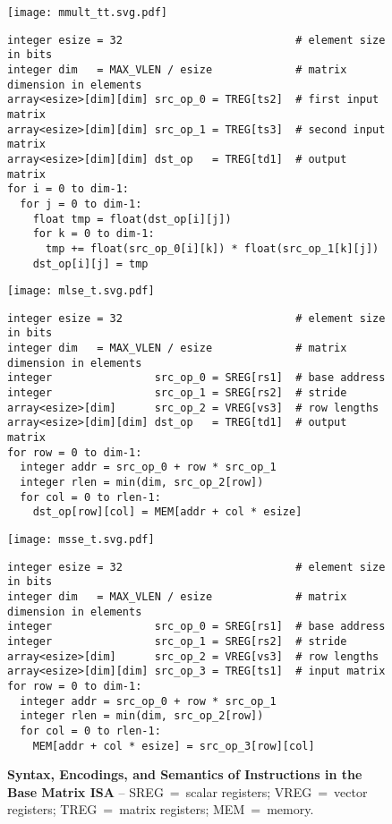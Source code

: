 \lstset{style=python-style}

\begin{figure*}[tp]
\centering


\texttt{[image: mmult\_tt.svg.pdf]}
\begin{lstlisting}[xleftmargin=0.025\tw]
integer esize = 32                           # element size in bits
integer dim   = MAX_VLEN / esize             # matrix dimension in elements
array<esize>[dim][dim] src_op_0 = TREG[ts2]  # first input matrix
array<esize>[dim][dim] src_op_1 = TREG[ts3]  # second input matrix
array<esize>[dim][dim] dst_op   = TREG[td1]  # output matrix
for i = 0 to dim-1:
  for j = 0 to dim-1:
    float tmp = float(dst_op[i][j])
    for k = 0 to dim-1:
      tmp += float(src_op_0[i][k]) * float(src_op_1[k][j])
    dst_op[i][j] = tmp
\end{lstlisting}


\texttt{[image: mlse\_t.svg.pdf]}
\begin{lstlisting}[xleftmargin=0.025\tw]
integer esize = 32                           # element size in bits
integer dim   = MAX_VLEN / esize             # matrix dimension in elements
integer                src_op_0 = SREG[rs1]  # base address
integer                src_op_1 = SREG[rs2]  # stride
array<esize>[dim]      src_op_2 = VREG[vs3]  # row lengths
array<esize>[dim][dim] dst_op   = TREG[td1]  # output matrix
for row = 0 to dim-1:
  integer addr = src_op_0 + row * src_op_1
  integer rlen = min(dim, src_op_2[row])
  for col = 0 to rlen-1:
    dst_op[row][col] = MEM[addr + col * esize]
\end{lstlisting}


\texttt{[image: msse\_t.svg.pdf]}
\begin{lstlisting}[xleftmargin=0.025\tw]
integer esize = 32                           # element size in bits
integer dim   = MAX_VLEN / esize             # matrix dimension in elements
integer                src_op_0 = SREG[rs1]  # base address
integer                src_op_1 = SREG[rs2]  # stride
array<esize>[dim]      src_op_2 = VREG[vs3]  # row lengths
array<esize>[dim][dim] src_op_3 = TREG[ts1]  # input matrix
for row = 0 to dim-1:
  integer addr = src_op_0 + row * src_op_1
  integer rlen = min(dim, src_op_2[row])
  for col = 0 to rlen-1:
    MEM[addr + col * esize] = src_op_3[row][col]
\end{lstlisting}

\caption[Matrix Instructions in the Base Matrix ISA]{
  \textbf{Syntax, Encodings, and Semantics of Instructions in the Base Matrix ISA} --
  SREG~=~scalar registers;
  VREG~=~vector registers;
  TREG~=~matrix registers;
  MEM~=~memory.
}
\label{fig:spz-base-mtx-insts}
\end{figure*}
